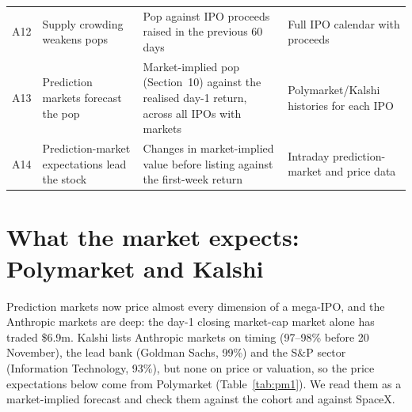 \documentclass[11pt]{article}
\begin{document}
\begin{table}[!htbp]
\begin{tabularx}{\linewidth}{@{}p{0.5cm}p{3.4cm}YY@{}}
A12 & Supply crowding weakens pops & Pop against IPO proceeds raised in the previous 60 days & Full IPO calendar with proceeds \\
A13 & Prediction markets forecast the pop & Market-implied pop (Section~10) against the realised day-1 return, across all IPOs with markets & Polymarket/Kalshi histories for each IPO \\
A14 & Prediction-market expectations lead the stock & Changes in market-implied value before listing against the first-week return & Intraday prediction-market and price data \\
\bottomrule
\end{tabularx}
\end{table}

\section{What the market expects: Polymarket and Kalshi}

Prediction markets now price almost every dimension of a mega-IPO, and the Anthropic markets are deep: the day-1 closing market-cap market alone has traded \$6.9m. Kalshi lists Anthropic markets on timing (97--98\% before 20 November), the lead bank (Goldman Sachs, 99\%) and the S\&P sector (Information Technology, 93\%), but none on price or valuation, so the price expectations below come from Polymarket (Table~\ref{tab:pm1}). We read them as a market-implied forecast and check them against the cohort and against SpaceX.
\end{document}
